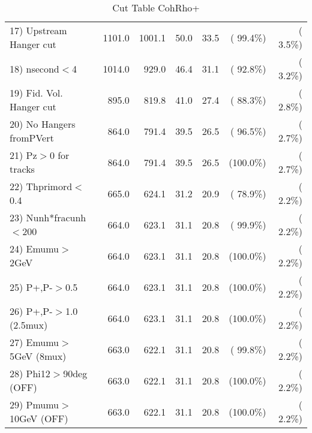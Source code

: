 \begin{table}[h!]
\begin{tabular}{||l||r|r|r|r|r|r||}
 17) Upstream Hanger cut  &       1101.0 &       1001.1 &         50.0 &         33.5 & ( 99.4\%) & (  3.5\%) \\
 18) nsecond$<$4          &       1014.0 &        929.0 &         46.4 &         31.1 & ( 92.8\%) & (  3.2\%) \\
 19) Fid. Vol. Hanger cut &        895.0 &        819.8 &         41.0 &         27.4 & ( 88.3\%) & (  2.8\%) \\
 20) No Hangers fromPVert &        864.0 &        791.4 &         39.5 &         26.5 & ( 96.5\%) & (  2.7\%) \\
 21) Pz$>$0 for tracks    &        864.0 &        791.4 &         39.5 &         26.5 & (100.0\%) & (  2.7\%) \\
 22) Thprimord$<$0.4      &        665.0 &        624.1 &         31.2 &         20.9 & ( 78.9\%) & (  2.2\%) \\
 23) Nunh*fracunh$<$200   &        664.0 &        623.1 &         31.1 &         20.8 & ( 99.9\%) & (  2.2\%) \\
 24) Emumu$>$2GeV         &        664.0 &        623.1 &         31.1 &         20.8 & (100.0\%) & (  2.2\%) \\
 25) P+,P-$>$0.5          &        664.0 &        623.1 &         31.1 &         20.8 & (100.0\%) & (  2.2\%) \\
 26) P+,P-$>$1.0 (2.5mux) &        664.0 &        623.1 &         31.1 &         20.8 & (100.0\%) & (  2.2\%) \\
 27) Emumu$>$5GeV  (8mux) &        663.0 &        622.1 &         31.1 &         20.8 & ( 99.8\%) & (  2.2\%) \\
 28) Phi12$>$90deg  (OFF) &        663.0 &        622.1 &         31.1 &         20.8 & (100.0\%) & (  2.2\%) \\
 29) Pmumu$>$10GeV  (OFF) &        663.0 &        622.1 &         31.1 &         20.8 & (100.0\%) & (  2.2\%) \\
 \hline
 \hline
 \end{tabular}
 \caption{Cut Table  CohRho+  }
 \label{tab-cutcohjpsi-mumu_cohrhop}
 \end{table}
